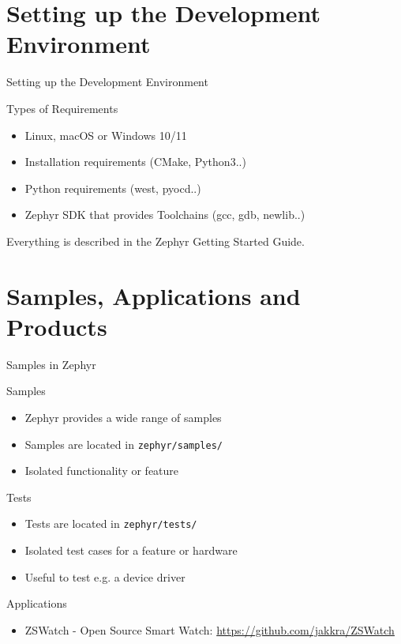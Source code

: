 \documentclass[10pt, aspectratio=169]{beamer}
\begin{document}
\section{Setting up the Development Environment}

\begin{frame}[fragile]{Setting up the Development Environment}

  \begin{block}{Types of Requirements}
    \begin{itemize}
      \item Linux, macOS or Windows 10/11
      \item Installation requirements (CMake, Python3..)
      \item Python requirements (west, pyocd..)
      \item Zephyr SDK that provides Toolchains (gcc, gdb, newlib..)
    \end{itemize}
  \end{block}
  Everything is described in the Zephyr Getting Started Guide.
\end{frame}

\section{Samples, Applications and Products}

\begin{frame}[fragile]{Samples in Zephyr}

  \begin{block}{Samples}
    \begin{itemize}
      \item Zephyr provides a wide range of samples
      \item Samples are located in \texttt{zephyr/samples/}
      \item Isolated functionality or feature
    \end{itemize}
  \end{block}
  \begin{block}{Tests}
    \begin{itemize}
      \item Tests are located in \texttt{zephyr/tests/}
      \item Isolated test cases for a feature or hardware
      \item Useful to test e.g. a device driver
    \end{itemize}
  \end{block}
  \begin{block}{Applications}
    \begin{itemize}
      \item ZSWatch - Open Source Smart Watch: {\scriptsize \url{https://github.com/jakkra/ZSWatch}}
    \end{itemize}
  \end{block}
\end{frame}
\end{document}
